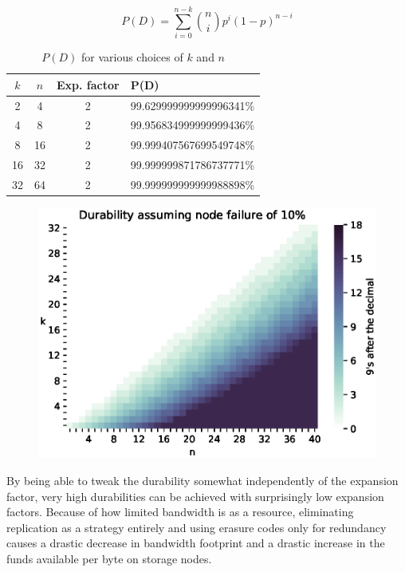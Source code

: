 \documentclass[a4paper,10pt]{article}
\begin{document}
\begin{equation}
P(D) = \sum_{i=0}^{n-k} \binom{n}{i} p^i (1-p)^{n-i}\label{eq:binom_cdf}
\end{equation}

\begin{table}[b]
	\centering
\begin{tabular}{c c c l}
$k$ & $n$ & Exp. factor & P(D) \\
\hline
2 & 4 & 2 & 99.629999999999996341\%\\
4 & 8 & 2 & 99.956834999999999436\%\\
8 & 16 & 2 & 99.999407567699549748\%\\
16 & 32 & 2 & 99.999999871786737771\%\\
32 & 64 & 2 & 99.999999999999988898\%\\
\end{tabular}
\caption{$P(D)$ for various choices of $k$ and $n$}
\end{table}

\begin{figure}
	\centering
\includegraphics[width=\linewidth]{durability/durability.eps}
\end{figure}


By being able to tweak the durability somewhat independently of the expansion
factor, very high durabilities can be achieved with surprisingly low expansion
factors. Because of how limited bandwidth is as a resource, eliminating
replication as a strategy entirely and using erasure codes only for redundancy
causes a drastic decrease in bandwidth footprint and a drastic increase in the
funds available per byte on storage nodes.
\end{document}
